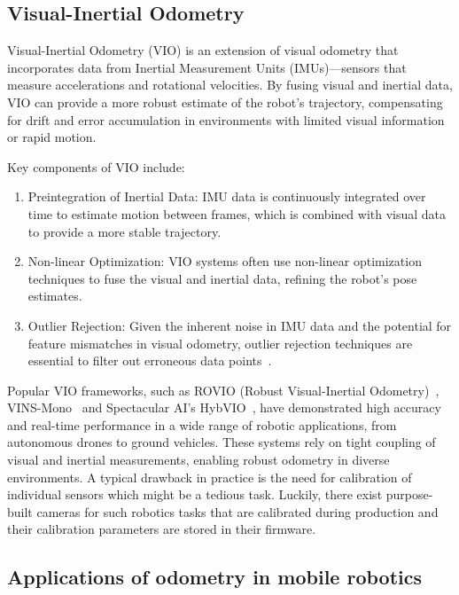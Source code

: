 \subsection{Visual-Inertial Odometry}

Visual-Inertial Odometry (VIO) is an extension of visual odometry that incorporates data from Inertial Measurement Units (IMUs)—sensors that measure accelerations and rotational velocities. By fusing visual and inertial data, VIO can provide a more robust estimate of the robot's trajectory, compensating for drift and error accumulation in environments with limited visual information or rapid motion.

Key components of VIO include:
\begin{enumerate}
    \item Preintegration of Inertial Data: IMU data is continuously integrated over time to estimate motion between frames, which is combined with visual data to provide a more stable trajectory.
    \item Non-linear Optimization: VIO systems often use non-linear optimization techniques to fuse the visual and inertial data, refining the robot’s pose estimates.
    \item Outlier Rejection: Given the inherent noise in IMU data and the potential for feature mismatches in visual odometry, outlier rejection techniques are essential to filter out erroneous data points~\cite{VIO}.
\end{enumerate}

Popular VIO frameworks, such as ROVIO (Robust Visual-Inertial Odometry)~\cite{robust_VIO}, VINS-Mono~\cite{vins_mono} and Spectacular AI's HybVIO~\cite{hybvio}, have demonstrated high accuracy and real-time performance in a wide range of robotic applications, from autonomous drones to ground vehicles. These systems rely on tight coupling of visual and inertial measurements, enabling robust odometry in diverse environments. A typical drawback in practice is the need for calibration of individual sensors which might be a tedious task. Luckily, there exist purpose-built cameras for such robotics tasks that are calibrated during production and their calibration parameters are stored in their firmware.

\subsection{Applications of odometry in mobile robotics}

